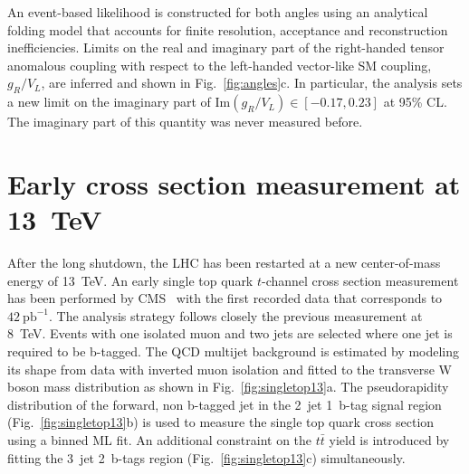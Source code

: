 \documentclass{PoS}
\begin{document}
An event-based likelihood is constructed for both angles using an analytical folding model that accounts for finite resolution, acceptance and reconstruction inefficiencies. Limits on the real and imaginary part of the right-handed tensor anomalous coupling with respect to the left-handed vector-like SM coupling, $g_{R}/V_{L}$, are inferred and shown in Fig.~\ref{fig:angles}c. In particular, the analysis sets a new limit on the imaginary part of $\mathrm{Im}(g_{R}/V_{L})\in[-0.17,0.23]$ at 95\% CL. The imaginary part of this quantity was never measured before.


\section{Early cross section measurement at 13~TeV}

After the long shutdown, the LHC has been restarted at a new center-of-mass energy of 13~TeV. An early single top quark $t$-channel cross section measurement has been performed by CMS~\cite{CMS-PAS-TOP-15-004} with the first recorded data that corresponds to $42~\mathrm{pb}^{-1}$.
The analysis strategy follows closely the previous measurement at 8~TeV. Events with one isolated muon and two jets are selected where one jet is required to be b-tagged. The QCD multijet background is estimated by modeling its shape from data with inverted muon isolation and fitted to the transverse W boson mass distribution as shown in Fig.~\ref{fig:singletop13}a. The pseudorapidity distribution of the forward, non b-tagged jet in the 2~jet 1~b-tag signal region (Fig.~\ref{fig:singletop13}b) is used to measure the single top quark cross section using a binned ML fit. An additional constraint on the $t\bar{t}$ yield is introduced by fitting the 3~jet 2~b-tags region (Fig.~\ref{fig:singletop13}c) simultaneously.
\end{document}
